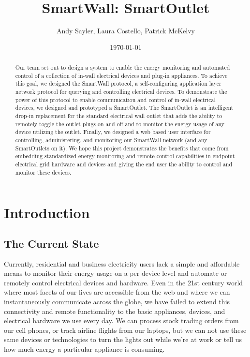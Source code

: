 \documentclass[12pt]{article}
\title{SmartWall: SmartOutlet}
\author{Andy Sayler, Laura Costello, Patrick McKelvy}
\date{\today}
\begin{document}
\maketitle
    
\begin{abstract}

Our team set out to design a system to enable the energy monitoring and
automated control of a collection of in-wall electrical devices and plug-in
appliances. To achieve this goal, we designed the SmartWall protocol,
a self-configuring application layer network protocol for querying and
controlling electrical devices. To demonstrate the power of this protocol
to enable communication and control of in-wall electrical devices, we
designed and prototyped a SmartOutlet. The SmartOutlet is an
intelligent drop-in
replacement for the standard electrical wall outlet that adds the
ability to remotely toggle the outlet plugs on and off and to monitor the
energy usage of any device utilizing the outlet. Finally, we designed a
web based user interface for controlling, administering, and
monitoring our SmartWall network (and any SmartOutlets on it). We hope
this project demonstrates the benefits that come from embedding
standardized energy monitoring and remote control capabilities in
endpoint electrical grid hardware and devices and giving the end user
the ability to control and monitor these devices.
  
\end{abstract}

\pagebreak

\tableofcontents

\pagebreak

\section{Introduction}

\subsection{The Current State}
Currently, residential and business electricity users lack a simple
and affordable means to monitor their energy usage on a per device
level and automate or remotely control electrical devices and
hardware. Even in the 21st century world where most facets of our
lives are accessible from the web and where we can instantaneously
communicate across the globe, we have failed to extend this
connectivity and remote functionality to the basic appliances, devices,
and electrical hardware we use every day. We can process stock trading
orders from our cell phones, or track airline flights from our
laptops, but we can not use these same devices or technologies to turn
the lights out while we're at work or tell us how much energy a
particular appliance is consuming.
\end{document}
